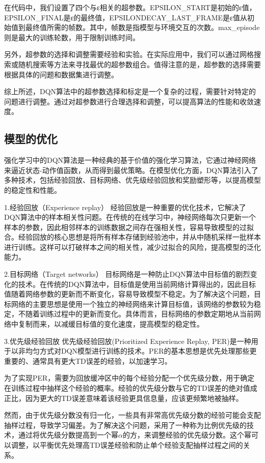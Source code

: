在代码中，我们设置了四个与ε相关的超参数。EPSILON\_START是初始的ε值，EPSILON\_FINAL是ε的最终值，EPSILONDECAY\_LAST\_FRAME是ε值从初始值到最终值所需的帧数。其中，帧数是指模型与环境交互的次数。max\_episode则是最大的训练轮数，用于限制训练时间。

另外，超参数的选择和调整需要经验和实验。在实际应用中，我们可以通过网格搜索或随机搜索等方法来寻找最优的超参数组合。值得注意的是，超参数的选择需要根据具体的问题和数据集进行调整。

综上所述，DQN算法中的超参数选择和标定是一个复杂的过程，需要针对特定的问题进行调整。通过对超参数进行合理选择和调整，可以提高算法的性能和收敛速度。

\subsection{模型的优化}

强化学习中的DQN算法是一种经典的基于价值的强化学习算法，它通过神经网络来逼近状态-动作值函数，从而得到最优策略。在模型优化方面，DQN算法引入了多种技术，包括经验回放、目标网络、优先级经验回放和奖励塑形等，以提高模型的稳定性和性能。

1.经验回放（Experience replay）
经验回放是一种重要的优化技术，它解决了DQN算法中的样本相关性问题。在传统的在线学习中，神经网络每次只更新一个样本的参数，因此相邻样本的训练数据之间存在强相关性，容易导致模型的过拟合。经验回放的核心思想是将所有样本存储到经验池中，并从中随机采样一批样本进行训练。这样可以打破样本之间的相关性，减少过拟合的风险，提高模型的泛化能力。

2.目标网络（Target networks）
目标网络是一种防止DQN算法中目标值的剧烈变化的技术。在传统的DQN算法中，目标值是使用当前网络计算得出的，因此目标值随着网络参数的更新而不断变化，容易导致模型不稳定。为了解决这个问题，目标网络的主要思想是使用一个独立的神经网络来计算目标值，该网络的参数较为稳定，不随着训练过程中的更新而变化。具体而言，目标网络的参数定期地从当前网络中复制而来，以减缓目标值的变化速度，提高模型的稳定性。

3.优先级经验回放
优先级经验回放(Prioritized Experience Replay, PER)是一种用于以非均匀方式对DQN模型进行训练的技术。PER的基本思想是优先处理那些更重要的、通常具有更大TD误差的经验，以加速学习。

为了实现PER，需要为回放缓冲区中的每个经验分配一个优先级分数，用于确定在训练过程中抽样这个经验的概率。经验的优先级分数与它的TD误差的绝对值成正比，因为更大的TD误差意味着该经验更具信息量，应该更频繁地被抽样。

然而，由于优先级分数没有归一化，一些具有非常高优先级分数的经验可能会支配抽样过程，导致学习偏差。为了解决这个问题，采用了一种称为比例优先级的技术，通过将优先级分数提高到一个幂$\alpha$的方，来调整经验的优先级分数。这个幂可以调整，以平衡优先处理高TD误差经验和防止单个经验支配抽样过程之间的关系。

